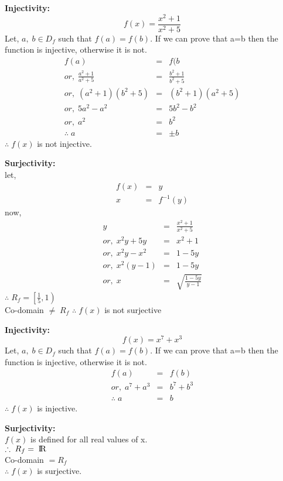 \documentclass{article}
\begin{document}
\begin{minipage}[t]{0.4\linewidth}
\textbf{Injectivity:}
    $$f(x) = \frac{x^2 +1}{x^2+5}$$
Let, $a,\;b\in D_f$ such that $f(a) = f(b)$. If we can prove that a=b then the function is injective, otherwise it is not.
\begin{eqnarray*}
    f(a) &=& f(b\\
    or,\;\frac{a^2+1}{a^2+5} &=& \frac{b^2+1}{b^2+5}\\
    or,\; (a^2+1)(b^2+5) &=& (b^2+1)(a^2+5)\\
    or,\; 5a^2-a^2 &=& 5b^2 - b^2\\
    or,\; a^2 &=& b^2\\
    \therefore \; a &=& \pm b
\end{eqnarray*}
    $\therefore\;f(x)$ is not injective.
\end{minipage}\hfill
\begin{minipage}[t]{0.4\linewidth}
\textbf{Surjectivity:}
\\let,
\begin{eqnarray*}
    f(x) &=& y\\
    x &=& f^{-1}(y)
\end{eqnarray*}
now,
\begin{eqnarray*}
    y &=& \frac{x^2+1}{x^2+5}\\
    or,\;x^2y+5y &=& x^2+1\\
    or,\; x^2y-x^2 &=& 1-5y\\
    or,\;x^2(y-1) &=& 1-5y\\
    or,\; x &=& \sqrt{\frac{1-5y}{y-1}}
\end{eqnarray*}
$\therefore\; R_f = \left[\frac{1}{5}, 1\right)$
\\Co-domain $\ne\;R_f$
$\therefore\;f(x)$ is not surjective
\end{minipage}
\vspace{1cm}
\vspace{1cm}
\newpage

\begin{minipage}[t]{0.4\linewidth}
\textbf{Injectivity:}
    $$f(x) = x^7 + x^3$$
Let, $a,\;b\in D_f$ such that $f(a) = f(b)$. If we can prove that a=b then the function is injective, otherwise it is not.
\begin{eqnarray*}
    f(a) &=& f(b)\\
    or,\;a^7+a^3 &=& b^7 + b^3\\
    \therefore\; a &=& b
\end{eqnarray*}
$\therefore\;f(x)$ is injective.
\end{minipage}\hfill
\begin{minipage}[t]{0.4\linewidth}
\textbf{Surjectivity:}
\\$f(x)$ is defined for all real values of x.\\
$\therefore\; R_f = \;\rm I\!R$
\\Co-domain $=R_f$\\
$\therefore\;f(x)$ is surjective.
\end{minipage}
\vspace{1cm}
\vspace{1cm}
\end{document}
